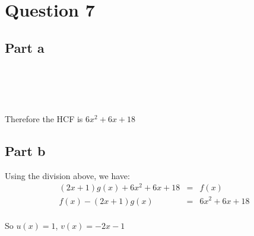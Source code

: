 \section*{Question 7}
\subsection*{Part a}
 \\\\

 \\\\

Therefore the HCF is $ 6x^2 + 6x + 18 $
\subsection*{Part b}
Using the division above, we have:
\begin{eqnarray*}
(2x + 1) g(x) + 6x^2 + 6x + 18 &=& f(x) \\
f(x) - (2x + 1 )g(x) &=& 6x^2 + 6x + 18 \\
\end{eqnarray*}

So $ u(x) = 1 $, $ v(x) = -2x - 1 $